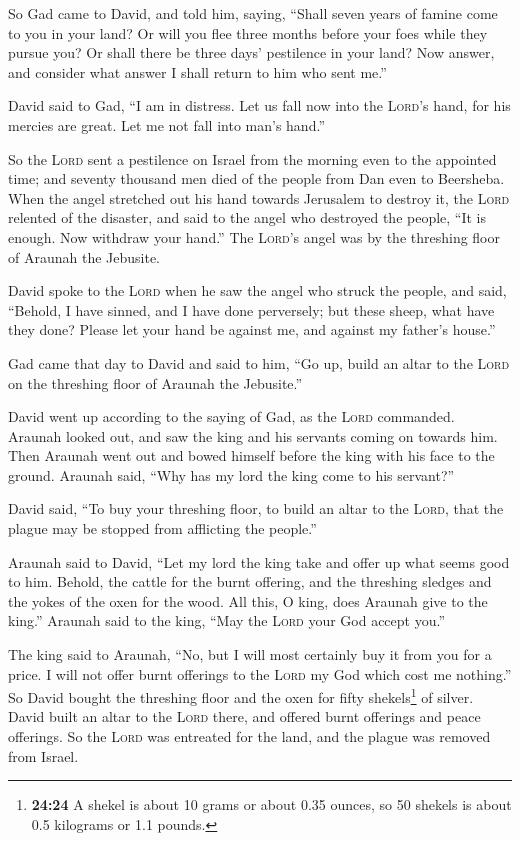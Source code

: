  So Gad came to David, and told him, saying, ``Shall
seven years of famine come to you in your land? Or will you flee three
months before your foes while they pursue you? Or shall there be three
days' pestilence in your land? Now answer, and consider what answer I
shall return to him who sent me.''

 David said to Gad, ``I am in distress. Let us fall now
into the \textsc{Lord}'s hand, for his mercies are great. Let me not
fall into man's hand.''

 So the \textsc{Lord} sent a pestilence on Israel from
the morning even to the appointed time; and seventy thousand men died of
the people from Dan even to Beersheba.  When the angel
stretched out his hand towards Jerusalem to destroy it, the
\textsc{Lord} relented of the disaster, and said to the angel who
destroyed the people, ``It is enough. Now withdraw your hand.'' The
\textsc{Lord}'s angel was by the threshing floor of Araunah the
Jebusite.

 David spoke to the \textsc{Lord} when he saw the angel
who struck the people, and said, ``Behold, I have sinned, and I have
done perversely; but these sheep, what have they done? Please let your
hand be against me, and against my father's house.''

 Gad came that day to David and said to him, ``Go up,
build an altar to the \textsc{Lord} on the threshing floor of Araunah
the Jebusite.''

 David went up according to the saying of Gad, as the
\textsc{Lord} commanded.  Araunah looked out, and saw the
king and his servants coming on towards him. Then Araunah went out and
bowed himself before the king with his face to the ground.
 Araunah said, ``Why has my lord the king come to his
servant?''

David said, ``To buy your threshing floor, to build an altar to the
\textsc{Lord}, that the plague may be stopped from afflicting the
people.''

 Araunah said to David, ``Let my lord the king take and
offer up what seems good to him. Behold, the cattle for the burnt
offering, and the threshing sledges and the yokes of the oxen for the
wood.  All this, O king, does Araunah give to the king.''
Araunah said to the king, ``May the \textsc{Lord} your God accept you.''

 The king said to Araunah, ``No, but I will most
certainly buy it from you for a price. I will not offer burnt offerings
to the \textsc{Lord} my God which cost me nothing.'' So David bought the
threshing floor and the oxen for fifty shekels\footnote{\textbf{24:24} A
  shekel is about 10 grams or about 0.35 ounces, so 50 shekels is about
  0.5 kilograms or 1.1 pounds.} of silver.  David built
an altar to the \textsc{Lord} there, and offered burnt offerings and
peace offerings. So the \textsc{Lord} was entreated for the land, and
the plague was removed from Israel.
